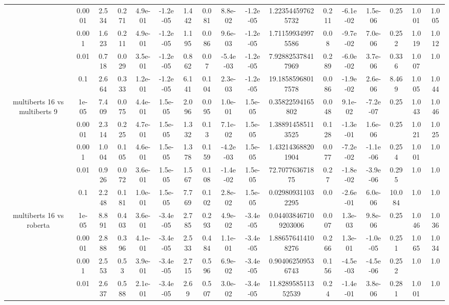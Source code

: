 \begin{tabular}{|c|c|c|c|c|c|c|c|c|c|c|c|c|c|c|c|c|}
 & 0.0001 & 2.534 & 0.271 & 4.9e-01 & -1.2e-05 & 1.442 & 0.081 & 8.8e-02 & -1.2e-05 & 1.223544597625732 & 0.211 & -6.1e-02 & 1.5e-06 & 0.25 & 1.001 & 1.005 \\
 & 0.001 & 1.623 & 0.211 & 4.9e-01 & -1.2e-05 & 1.195 & 0.086 & 9.6e-03 & -1.2e-05 & 1.711599349975586 & 0.08 & -9.7e-02 & 7.0e-06 & 0.252 & 1.019 & 1.012 \\
 & 0.01 & 0.718 & 0.029 & 3.5e-01 & -1.2e-05 & 0.862 & 0.07 & -5.4e-03 & -1.2e-05 & 7.928825378417969 & 0.289 & -6.0e-02 & 3.7e-06 & 0.336 & 1.007 & 1.0 \\
 & 0.1 & 2.664 & 0.333 & 1.2e-01 & -1.2e-05 & 6.141 & 0.104 & 2.3e-03 & -1.2e-05 & 19.18585968017578 & 0.086 & -1.9e-02 & 2.6e-06 & 8.469 & 1.005 & 1.044 \\
\hline
\multirow{5}{*}{multiberts 16 vs multiberts 9} & 1e-05 & 7.409 & 0.075 & 4.4e-01 & 1.5e-05 & 2.096 & 0.095 & 1.0e-01 & 1.5e-05 & 0.35822594165802 & 0.048 & 9.1e-02 & -7.2e-07 & 0.25 & 1.043 & 1.046 \\
 & 0.0001 & 2.314 & 0.225 & 4.7e-01 & 1.5e-05 & 1.332 & 0.13 & 7.1e-02 & 1.5e-05 & 1.388914585113525 & 0.128 & -1.3e-01 & 1.6e-06 & 0.25 & 1.021 & 1.025 \\
 & 0.001 & 1.004 & 0.105 & 4.6e-01 & 1.5e-05 & 1.378 & 0.159 & -4.2e-03 & 1.5e-05 & 1.432143688201904 & 0.077 & -7.2e-02 & -1.1e-06 & 0.254 & 1.001 & 1.0 \\
 & 0.01 & 0.926 & 0.072 & 3.6e-01 & 1.5e-05 & 1.567 & 0.108 & -1.4e-02 & 1.5e-05 & 72.707763671875 & 0.27 & -1.8e-02 & -3.9e-06 & 0.295 & 1.0 & 1.0 \\
 & 0.1 & 2.248 & 0.181 & 1.0e-01 & 1.5e-05 & 7.769 & 0.102 & 2.8e-02 & 1.5e-05 & 0.029809311032295 & 0.0 & -2.6e-01 & 6.0e-06 & 10.084 & 1.0 & 1.0 \\
\hline
\multirow{5}{*}{multiberts 16 vs roberta } & 1e-05 & 8.891 & 0.403 & 3.6e-01 & -3.4e-05 & 2.785 & 0.293 & 4.9e-02 & -3.4e-05 & 0.044038467109203006 & 0.007 & 1.3e-03 & 9.8e-06 & 0.25 & 1.046 & 1.036 \\
 & 0.0001 & 2.888 & 0.396 & 4.1e-01 & -3.4e-05 & 2.533 & 0.484 & 1.1e-01 & -3.4e-05 & 1.886576414108276 & 0.266 & 1.3e-01 & -1.0e-05 & 0.251 & 1.065 & 1.034 \\
 & 0.001 & 2.553 & 0.53 & 3.9e-01 & -3.4e-05 & 2.715 & 0.596 & 6.9e-02 & -3.4e-05 & 0.904062509536743 & 0.156 & -4.5e-03 & -4.5e-06 & 0.252 & 1.0 & 1.0 \\
 & 0.01 & 2.637 & 0.588 & 2.1e-01 & -3.4e-05 & 2.69 & 0.507 & 3.0e-02 & -3.4e-05 & 11.828958511352539 & 0.24 & -1.4e-01 & 3.8e-06 & 0.281 & 1.001 & 1.0 \\

\end{tabular}
